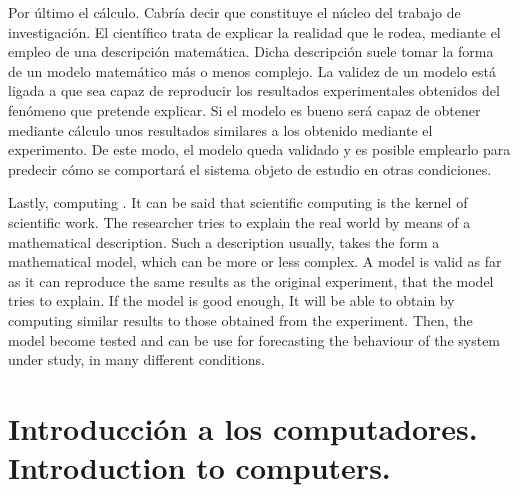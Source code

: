 \begin{paracol}{2}
\switchcolumn
Por último el cálculo.  Cabría decir que constituye el núcleo del trabajo de investigación. El científico trata de explicar la realidad que le rodea, mediante el empleo de una descripción matemática. Dicha descripción suele tomar la forma de un modelo matemático más o menos complejo. La validez de un modelo está ligada a que sea capaz de reproducir los resultados experimentales obtenidos del fenómeno que pretende explicar. Si el modelo es bueno será capaz de obtener mediante cálculo unos resultados similares a los obtenido mediante el experimento. De este modo, el modelo queda validado y es posible emplearlo para predecir cómo se comportará el sistema objeto de estudio en otras condiciones.

\switchcolumn
Lastly, computing . It can be said that scientific computing is the kernel of scientific work. The researcher tries to explain the real world by means of a mathematical description. Such a description usually, takes the form a mathematical model, which can be more or less complex. A model is valid as far as it can reproduce the same results as the original experiment, that the model tries to explain. If the model is good enough, It will be able to obtain by computing similar results to those obtained from the experiment. Then, the model become tested and can be use for forecasting the behaviour of the system under study, in many different conditions.     
\end{paracol}

\section{Introducción a los computadores.\\ Introduction to computers.}  

